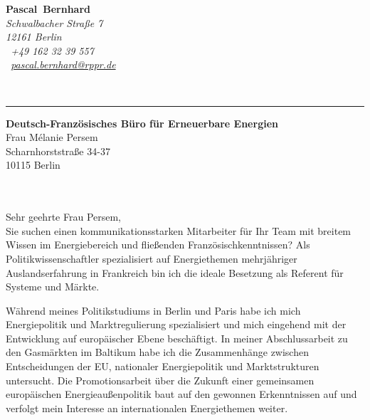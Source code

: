 \documentclass[11pt,a4paper]{article}
\def\firstname{Pascal}
\def\familyname{Bernhard}
\begin{document}
\sffamily   %
\hfill%
\begin{minipage}[t]{.6\textwidth}
	\raggedleft%
	{\bfseries {\color{firstnamecolor}\firstname}~{\color{familynamecolor}\familyname}}\\[.35ex]
	\small\itshape%
	Schwalbacher Straße 7\\
	12161 Berlin\\[.35ex]
	\Mobilefone~+49 162 32 39 557 \\
	\Letter~\href{mailto:pascal.bernhard@rppr.de}{pascal.bernhard@rppr.de}
\end{minipage}\\[0.5em]
%
{\color{firstnamecolor}\rule{\textwidth}{.25ex}}
%
\begin{minipage}[t]{.4\textwidth}
	\raggedright%
	\vspace*{1em}
	\textbf{Deutsch-Französisches Büro für Erneuerbare Energien} \\
	Frau Mélanie Persem \\[.35ex]
	\small%
	Scharnhorststraße 34-37\\
	10115 Berlin
\end{minipage}
%
\hfill
%
\begin{minipage}[t]{.4\textwidth}
	\raggedleft %
\end{minipage}\\[0.2em]


{\bfseries \color{familynamecolor}{Referent System und Märkte -- Ihre Stellenanzeige bei eejobs}}\\[0.75em]

Sehr geehrte Frau Persem,\\
Sie suchen einen kommunikationsstarken Mitarbeiter für Ihr Team mit breitem Wissen im Energiebereich und fließenden Französischkenntnissen? Als Politikwissenschaftler spezialisiert auf Energiethemen mehrjähriger Auslandserfahrung in Frankreich bin ich die ideale Besetzung als Referent für Systeme und Märkte.

Während meines Politikstudiums in Berlin und Paris habe ich mich Energiepolitik und Marktregulierung spezialisiert und mich eingehend mit der Entwicklung auf europäischer Ebene beschäftigt. In meiner Abschlussarbeit zu den Gasmärkten im Baltikum habe ich die Zusammenhänge zwischen Entscheidungen der EU, nationaler Energiepolitik und Marktstrukturen untersucht. Die Promotionsarbeit über die Zukunft einer gemeinsamen europäischen Energieaußenpolitik baut auf den gewonnen Erkenntnissen auf und verfolgt mein Interesse an internationalen Energiethemen weiter.
\end{document}
